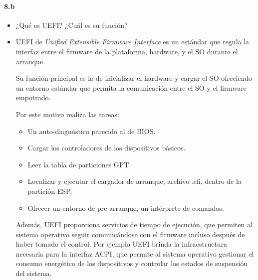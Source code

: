 \documentclass[10pt,a4paper]{paper}
\begin{document}
	\paragraph{8.b}
	\begin{itemize}
		\item ¿Qué es UEFI? ¿Cuál es su función?
		
		\item UEFI de \textit{Unified Extensible Firmware Interface} es un estándar que
		regula la interfaz entre el firmware de la plataforma, hardware, y el SO durante
		el arranque.
		
		Su función principal es la de inicializar el hardware y cargar el SO ofreciendo
		un entorno estándar que permita la comunicación entre el SO y el firmware
		empotrado.
		
		Por este motivo realiza las tareas:
		\begin{itemize}
			\item Un auto-diagnóstico parecido al de BIOS.
			
			\item Cargar los controladores de los dispositivos básicos.
			
			\item Leer la tabla de particiones GPT 
			
			\item Localizar y ejecutar el cargador de arranque, archivo .efi, dentro de la
			partición ESP.
			
			\item Ofrecer un entorno de pre-arranque, un intérprete de comandos.
			
		\end{itemize}
		
		
		Además, UEFI proporciona servicios de tiempo de ejecución, que permiten al
		sistema operativo seguir comunicándose con el firmware incluso después de haber
		tomado el control. Por ejemplo UEFI brinda la infraestructura necesaria para la
		interfaz ACPI, que permite al sistema operativo gestionar el consumo energético
		de los dispositivos y controlar los estados de suspensión del sistema.
		
	\end{itemize}
	
	
\end{document}
